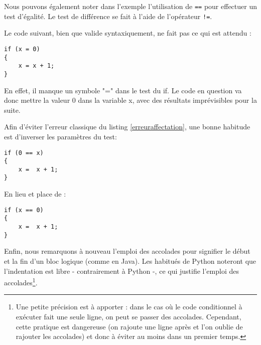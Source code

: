 Nous pouvons \'egalement noter dans l'exemple l'utilisation de \texttt{==} pour
effectuer un test d'\'egalit\'e. Le test de diff\'erence se fait \`a l'aide de
l'op\'erateur \verb+!=+.\\

\begin{warning}
Le code suivant, bien que valide syntaxiquement, ne fait pas ce qui est attendu :\\
\end{warning}

\begin{DDbox}{\linewidth}
\begin{lstlisting}[caption=Une erreur classique, label=erreuraffectation]
if (x = 0)
{
    x = x + 1;
}
\end{lstlisting}
\end{DDbox}

En effet, il manque un symbole "=" dans le test du if. Le code en question va donc mettre
la valeur 0 dans la variable x, avec des r\'esultats impr\'evisibles pour la suite.

\begin{habitudes}[Test]

Afin d'\'eviter l'erreur classique du listing \ref{erreuraffectation}, une bonne habitude est d'inverser les param\`etres du test:\\

\begin{DDbox}{\linewidth}
\begin{lstlisting}
if (0 == x)
{
	x =  x + 1;
}
\end{lstlisting}
\end{DDbox}

En lieu et place de :\\

\begin{DDbox}{\linewidth}\begin{lstlisting}
if (x == 0)
{
	x =  x + 1;
}
\end{lstlisting}
\end{DDbox}

\end{habitudes}

Enfin, nous remarquons \`a nouveau l'emploi des accolades pour signifier le
d\'ebut et la fin d'un bloc logique (comme en Java). Les habitu\'es de
Python noteront que l'indentation est libre - contrairement \`a Python -, ce
qui justifie l'emploi des accolades\footnote{Une petite pr\'ecision est à apporter : dans le cas o\`u le code conditionnel à ex\'ecuter fait une seule ligne, on peut se passer des accolades.  Cependant, cette pratique est dangereuse (on rajoute une ligne apr\`es et l'on oublie de rajouter les accolades) et donc \`a \'eviter au moins dans un premier temps.}.

